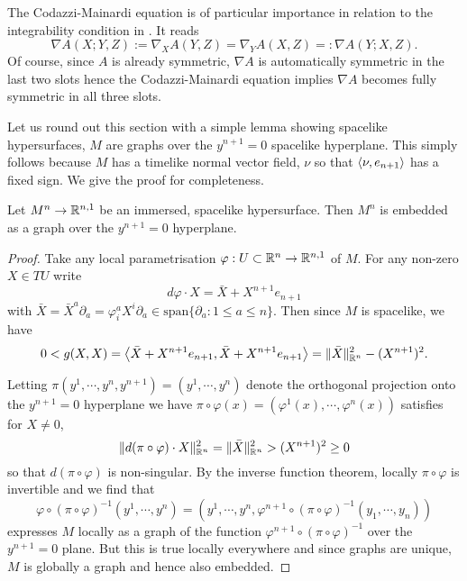 \documentclass[a4paper, 12pt]{amsart}
\begin{document}
The Codazzi-Mainardi equation is of particular importance in relation to the integrability condition in . It reads
\begin{equation}
\label{eq:codazzi}
\nabla A (X; Y, Z) := \nabla_X A (Y, Z) = \nabla_Y A(X, Z) =: \nabla A(Y; X, Z).
\end{equation}
Of course, since \(A\) is already symmetric, \(\nabla A\) is automatically symmetric in the last two slots hence the Codazzi-Mainardi equation implies \(\nabla A\) becomes fully symmetric in all three slots.

Let us round out this section with a simple lemma showing spacelike hypersurfaces, \(M\) are graphs over the \(y^{n+1} = 0\) spacelike hyperplane. This simply follows because \(M\) has a timelike normal vector field, \(\nu\) so that \(\left\langle \nu,e_{n+1} \right\rangle\) has a fixed sign. We give the proof for completeness.

\begin{lemma}
\label{lem:graph}

Let \(M^n \to \mathbb{R}^{n,1}\) be an immersed, spacelike hypersurface. Then \(M^n\) is embedded as a graph over the \(y^{n+1} = 0\) hyperplane.
\end{lemma}

\begin{proof}
Take any local parametrisation \(\varphi : U \subset \mathbb{R}^n \to \mathbb{R}^{n,1}\) of \(M\). For any non-zero \(X \in TU\) write
\[
d\varphi \cdot X = \bar{X} + X^{n+1} e_{n+1}
\]
with \(\bar{X} = \bar{X}^a \partial_a = \varphi^a_i X^i \partial_a \in \text{span} \{\partial_a : 1 \leq a \leq n\}\). Then since \(M\) is spacelike, we have
\[
0 < g(X, X) = \left\langle \bar{X} + X^{n+1} e_{n+1},\bar{X} + X^{n+1} e_{n+1} \right\rangle = \|\bar{X}\|_{\mathbb{R}^n}^2 - (X^{n+1})^2.
\]

Letting \(\pi(y^1, \cdots, y^n, y^{n+1}) = (y^1, \cdots, y^n)\) denote the orthogonal projection onto the \(y^{n+1} = 0\) hyperplane we have \(\pi \circ \varphi (x) = (\varphi^1(x), \cdots, \varphi^n(x))\) satisfies for \(X \ne 0\),
\[
\|d(\pi \circ \varphi) \cdot X\|_{\mathbb{R}^n}^2 = \|\bar{X}\|_{\mathbb{R}^n}^2  > (X^{n+1})^2 \geq 0
\]
so that \(d(\pi \circ \varphi)\) is non-singular. By the inverse function theorem, locally \(\pi \circ \varphi\) is invertible and we find that
\[
\varphi \circ (\pi \circ \varphi)^{-1} (y^1, \cdots, y^n) = (y^1, \cdots, y^n, \varphi^{n+1} \circ (\pi \circ \varphi)^{-1} (y_1, \cdots, y_n))
\]
expresses \(M\) locally as a graph of the function \(\varphi^{n+1} \circ (\pi \circ \varphi)^{-1}\) over the \(y^{n+1} = 0\) plane. But this is true locally everywhere and since graphs are unique, \(M\) is globally a graph and hence also embedded.
\end{proof}
\end{document}
